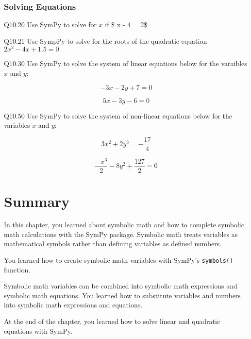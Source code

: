 \documentclass{book}
\newenvironment{problems}{}{}  %
\newcommand{\passthrough}[1]{#1}
\begin{document}
    
        \hypertarget{solving-equations}{%
\subsubsection{Solving Equations}\label{solving-equations}}
    




    
        \begin{problems}
        Q10.20 Use SymPy to solve for \(x\) if \$ x - 4 = 2\$

Q10.21 Use SympPy to solve for the roots of the quadratic equation
\(2x^2 - 4x + 1.5 = 0\)

Q10.30 Use SymPy to solve the system of linear equations below for the
varaibles \(x\) and \(y\):

\[ -3x - 2y + 7  = 0 \]

\[ 5x - 3y - 6 = 0 \]

Q10.50 Use SymPy to solve the system of non-linear equations below for
the variables \(x\) and \(y\):

\[ 3x^2 + 2y^3 = -\frac{17}{4} \]

\[ \frac{-x^3}{2} - 8y^2 + \frac{127}{2} = 0 \]
        \end{problems}

    




    
        \newpage
        \hypertarget{summary}{%
\section{Summary}\label{summary}}

    




    
        In this chapter, you learned about symbolic math and how to complete
symbolic math calculations with the SymPy package. Symbolic math treats
variables as mathematical symbols rather than defining variables as
defined numbers.

You learned how to create symbolic math variables with SymPy's
\passthrough{\lstinline!symbols()!} function.

Symbolic math variables can be combined into symbolic math expressions
and symbolic math equations. You learned how to substitute variables and
numbers into symbolic math expressions and equations.

At the end of the chapter, you learned how to solve linear and quadratic
equations with SymPy.
\end{document}
